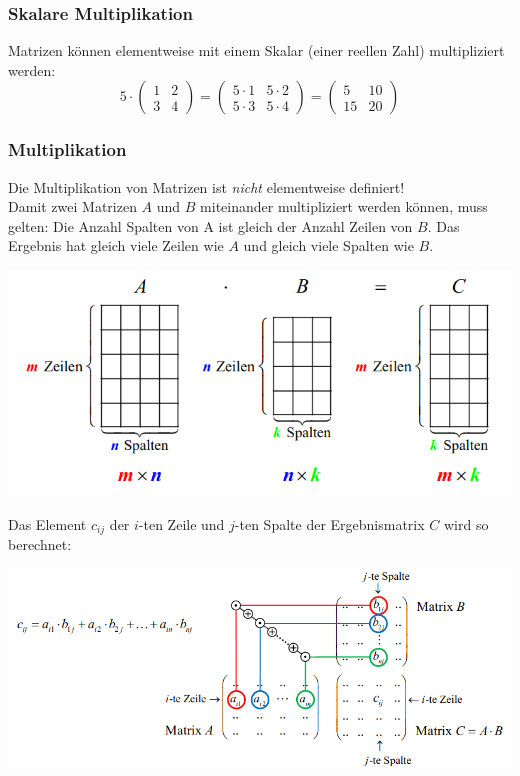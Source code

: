 \subsubsection{Skalare Multiplikation}%
\label{ssub:Skalare Multiplikation}
Matrizen können elementweise mit einem Skalar (einer reellen Zahl) multipliziert werden:
\begin{equation*}
  5 \cdot
  \begin{pmatrix} 
    1 & 2 \\
    3 & 4
  \end{pmatrix} 
  =
  \begin{pmatrix} 
    5 \cdot 1 & 5 \cdot 2 \\
    5 \cdot 3 & 5 \cdot 4
  \end{pmatrix} 
  =
  \begin{pmatrix} 
    5 & 10 \\
    15 & 20
  \end{pmatrix} 
\end{equation*}

\subsubsection{Multiplikation}%
\label{ssub:Multiplikation}
Die Multiplikation von Matrizen ist \textit{nicht} elementweise definiert! \\
Damit zwei Matrizen $A$ und $B$ miteinander multipliziert werden können, muss gelten: Die Anzahl Spalten von A ist gleich der Anzahl Zeilen von $B$.
Das Ergebnis hat gleich viele Zeilen wie $A$ und gleich viele Spalten wie $B$.
\begin{center}
  \includegraphics[width=0.6\linewidth]{images/multiplikation.png}
\end{center}
Das Element $c_{ij}$ der $i$-ten Zeile und $j$-ten Spalte der Ergebnismatrix $C$ wird so berechnet:
\begin{center}
  \includegraphics[width=0.8\linewidth]{images/multiplikation2.png}
\end{center}

